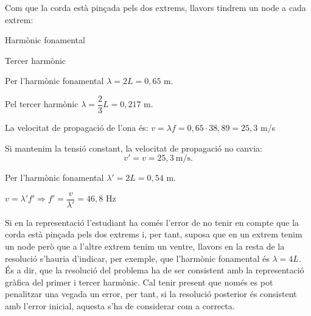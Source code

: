 \begin{solapartat}
 Com que la corda està pinçada pels dos extrems, llavors tindrem un node a
cada extrem:

\begin{minipage}{0.48\linewidth}
\centering Harmònic fonamental
\end{minipage}\hfill
\begin{minipage}{0.48\linewidth}
\centering Tercer harmònic
\end{minipage}

 Per l'harmònic fonamental $\lambda = 2L = 0,65$ m.

 Pel tercer harmònic $\lambda = \dfrac{2}{3}L = 0,217$ m.

 La velocitat de propagació de l'ona és: $v = \lambda f = 0,65\cdot 38,89 = 25,3$ m/s

 Si mantenim la tensió constant, la velocitat de propagació no canvia:
\[ v' = v = 25,3\ \mathrm{m/s.} \]

 Per l'harmònic fonamental $\lambda' = 2L = 0,54$ m.

 $v = \lambda' f' \Rightarrow f' = \dfrac{v}{\lambda'} = 46,8$ Hz

Si en la representació l'estudiant ha comés l'error de no tenir en compte que la corda
està pinçada pels dos extrems i, per tant, suposa que en un extrem tenim un node però que
a l'altre extrem tenim un ventre, llavors en la resta de la resolució s'hauria d'indicar,
per exemple, que l'harmònic fonamental és $\lambda = 4L$. És a dir, que la resolució del
problema ha de ser consistent amb la representació gràfica del primer i tercer harmònic.
Cal tenir present que només es pot penalitzar una vegada un error, per tant, si la
resolució posterior és consistent amb l'error inicial, aquesta s'ha de considerar com a
correcta.
\end{solapartat}

